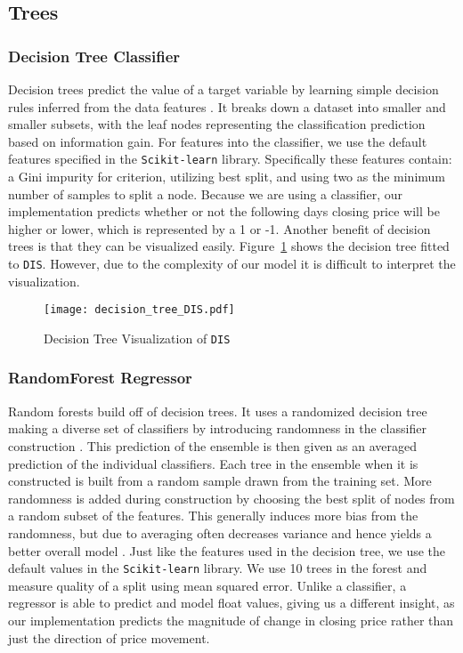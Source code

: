 \documentclass[../thesis.tex]{subfiles}
\begin{document}
\subsection{Trees}

\subsubsection{Decision Tree Classifier}
Decision trees predict the value of a target variable by learning simple decision rules inferred from the data features \cite{PedregosaFABIANPEDREGOSA2011}. It breaks down a dataset into smaller and smaller subsets, with the leaf nodes representing the classification prediction based on information gain. For features into the classifier, we use the default features specified in the \texttt{Scikit-learn} library. Specifically these features contain: a Gini impurity for criterion, utilizing best split, and using two as the minimum number of samples to split a node. Because we are using a classifier, our implementation predicts whether or not the following days closing price will be higher or lower, which is represented by a 1 or -1. Another benefit of decision trees is that they can be visualized easily. Figure~\ref{DecTreefigure} shows the decision tree fitted to \texttt{DIS}. However, due to the complexity of our model it is difficult to interpret the visualization. 

\begin{figure}[h]
\centering
\texttt{[image: decision\_tree\_DIS.pdf]}
\caption{Decision Tree Visualization of \texttt{DIS} \label{overflow}}
\label{DecTreefigure}
\end{figure}

\subsubsection{RandomForest Regressor}
Random forests build off of decision trees. It uses a randomized decision tree making a diverse set of classifiers by introducing randomness in the classifier construction \cite{PedregosaFABIANPEDREGOSA2011}. This prediction of the ensemble is then given as an averaged prediction of the individual classifiers. Each tree in the ensemble when it is constructed is built from a random sample drawn from the training set. More randomness is added during construction by choosing the best split of nodes from a random subset of the features. This generally induces more bias from the randomness, but due to averaging often decreases variance and hence yields a better overall model \cite{PedregosaFABIANPEDREGOSA2011}. Just like the features used in the decision tree, we use the default values in the \texttt{Scikit-learn} library. We use 10 trees in the forest and measure quality of a split using mean squared error. Unlike a classifier, a regressor is able to predict and model float values, giving us a different insight, as our implementation predicts the magnitude of change in closing price rather than just the direction of price movement. 
\end{document}

